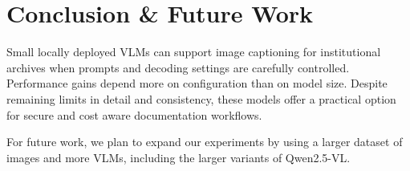 \documentclass[runningheads]{llncs}
\begin{document}


\section{Conclusion \& Future Work}
Small locally deployed VLMs can support image captioning for institutional archives when prompts and decoding settings are carefully controlled. Performance gains depend more on configuration than on model size. Despite remaining limits in detail and consistency, these models offer a practical option for secure and cost aware documentation workflows.

For future work, we plan to expand our experiments by using a larger dataset of images and more VLMs, including the larger variants of Qwen2.5-VL.
\end{document}
